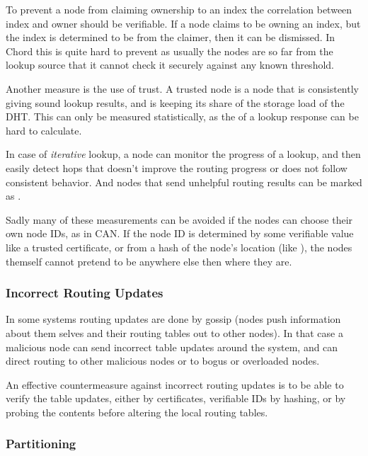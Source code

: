 To prevent a node from claiming ownership to an index the correlation between index and
 owner should be verifiable. If a node claims to be owning an index, but the index is
 determined to be  from the claimer, then it can be dismissed. In Chord
 this is quite hard to prevent as usually the nodes are so far from the lookup source
 that it cannot check it securely against any known threshold.

Another measure is the use of trust. A trusted node is a node that is consistently
 giving sound lookup results, and is keeping its share of the storage load of the DHT.
 This can only be measured statistically, as the  of a lookup response
 can be hard to calculate.

In case of \emph{iterative} lookup, a node can monitor the progress of a lookup, and
 then easily detect hops that doesn't improve the routing progress or does not follow
 consistent behavior. And nodes that
 send unhelpful routing results can be marked as .

Sadly many of these measurements can be avoided if the nodes can choose their own
 node IDs, as in CAN\cite{sit-02-security}. If the node ID is determined by some
 verifiable value like a trusted certificate, or from a hash of the node's location (like
 ), the nodes themself cannot pretend to be anywhere else then
 where they are.

\subsubsection{Incorrect Routing Updates}

In some systems routing updates are done by gossip\cite{maymounkov-02-kademlia}
(nodes push information about them selves and their routing tables out to other nodes).
 In that case a malicious node can send incorrect
 table updates around the system, and can direct routing to other malicious nodes or
 to bogus or overloaded nodes.

An effective countermeasure against incorrect routing updates is to be able to verify
 the table updates, either
 by certificates, verifiable IDs by hashing, or by probing the contents before altering the local
 routing tables.

\subsubsection{Partitioning}

